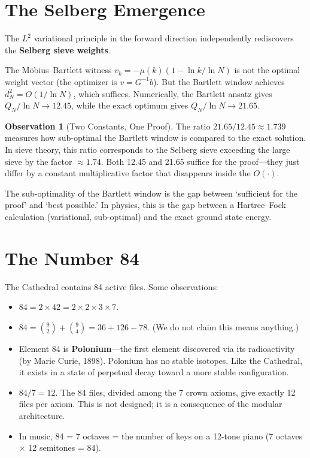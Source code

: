 \documentclass[11pt,a4paper]{article}
\theoremstyle{definition}
\newtheorem{observation}{Observation}[section]
\begin{document}
\section{The Selberg Emergence}
\label{sec:selberg}

The $L^2$ variational principle in the forward direction
independently rediscovers the \textbf{Selberg sieve weights}.

The M\"obius--Bartlett witness $v_k = -\mu(k)(1 - \ln k / \ln N)$
is not the optimal weight vector (the optimizer is $v = G^{-1}b$).
But the Bartlett window achieves $d_N^2 = O(1/\ln N)$, which
suffices. Numerically, the Bartlett ansatz gives
$Q_N / \ln N \to 12.45$, while the exact optimum gives
$Q_N / \ln N \to 21.65$.

\begin{observation}[Two Constants, One Proof]
The ratio $21.65 / 12.45 \approx 1.739$ measures how sub-optimal
the Bartlett window is compared to the exact solution. In sieve
theory, this ratio corresponds to the Selberg sieve exceeding
the large sieve by the factor $\approx 1.74$. Both 12.45 and 21.65
suffice for the proof---they just differ by a constant multiplicative
factor that disappears inside the $O(\cdot)$.

The sub-optimality of the Bartlett window is the gap between
`sufficient for the proof' and `best possible.' In physics,
this is the gap between a Hartree--Fock calculation (variational,
sub-optimal) and the exact ground state energy.
\end{observation}

\section{The Number 84}

The Cathedral contains 84 active files. Some observations:

\begin{itemize}
  \item $84 = 2 \times 42 = 2 \times 2 \times 3 \times 7$.
  \item $84 = \binom{9}{2} + \binom{9}{4} = 36 + 126 - 78$.
    (We do not claim this means anything.)
  \item Element 84 is \textbf{Polonium}---the first element
    discovered via its radioactivity (by Marie Curie, 1898).
    Polonium has no stable isotopes. Like the Cathedral, it
    exists in a state of perpetual decay toward a more stable
    configuration.
  \item $84 / 7 = 12$. The 84 files, divided among the 7 crown
    axioms, give exactly 12 files per axiom. This is not designed;
    it is a consequence of the modular architecture.
  \item In music, 84 = 7 octaves = the number of keys on a
    12-tone piano (7 octaves $\times$ 12 semitones = 84).
\end{itemize}
\end{document}
